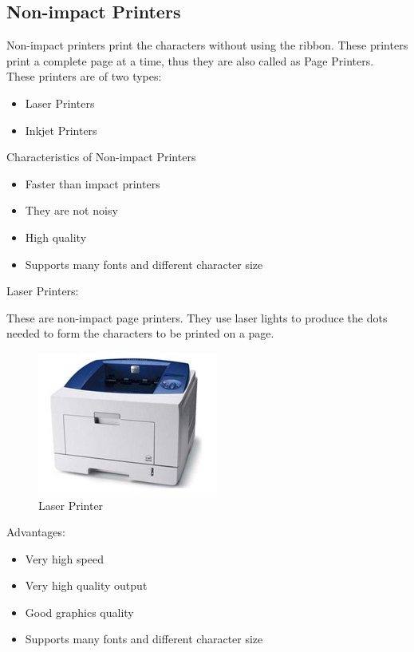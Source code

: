 \documentclass[11pt,a4paper,twoside]{article}
\begin{document}
\subsection{Non-impact Printers} 
Non-impact printers print the characters without using the ribbon. These printers print a complete page at a time, thus they are also called as Page Printers. \\
These printers are of two types:  
\begin{itemize}
    \item Laser Printers  
\item Inkjet Printers
\end{itemize}
Characteristics of Non-impact Printers  
\begin{itemize}
    \item Faster than impact printers
\item They are not noisy
\item High quality
\item Supports many fonts and different character size
\end{itemize}
Laser Printers: \par
These are non-impact page printers. They use laser lights to produce the dots needed to form the characters to be printed on a page.
\begin{figure}[H]
\centering \includegraphics[scale=1]{Fig 18.jpg}
\caption{Laser Printer}
\end{figure}
\noindent Advantages:
\begin{itemize}
    \item Very high speed  
\item Very high quality output
\item Good graphics quality
\item Supports many fonts and different character size
\end{itemize}
\end{document}
